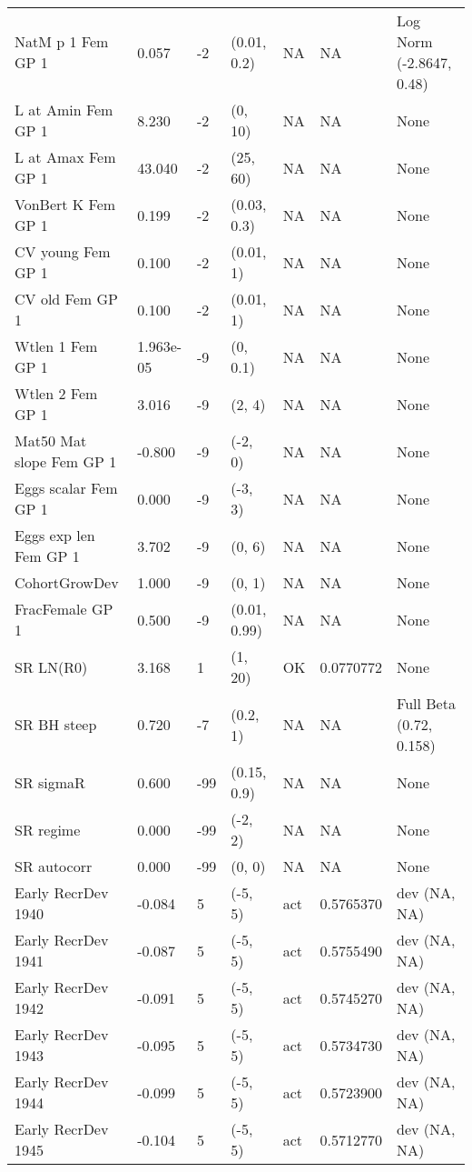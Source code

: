 \documentclass[11pt,
  english,
  a4paper,
]{article}
\begin{document}
\begin{landscape}
\begin{longtable}[t]{>{\raggedright\arraybackslash}p{6cm}lllll>{\raggedright\arraybackslash}p{4cm}}
\endfoot
\bottomrule
\endlastfoot
NatM p 1 Fem GP 1 & 0.057 & -2 & (0.01, 0.2) & NA & NA & Log Norm (-2.8647, 0.48)\\
L at Amin Fem GP 1 & 8.230 & -2 & (0, 10) & NA & NA & None\\
L at Amax Fem GP 1 & 43.040 & -2 & (25, 60) & NA & NA & None\\
VonBert K Fem GP 1 & 0.199 & -2 & (0.03, 0.3) & NA & NA & None\\
CV young Fem GP 1 & 0.100 & -2 & (0.01, 1) & NA & NA & None\\
CV old Fem GP 1 & 0.100 & -2 & (0.01, 1) & NA & NA & None\\
Wtlen 1 Fem GP 1 & 1.963e-05 & -9 & (0, 0.1) & NA & NA & None\\
Wtlen 2 Fem GP 1 & 3.016 & -9 & (2, 4) & NA & NA & None\\
Mat50%
Mat slope Fem GP 1 & -0.800 & -9 & (-2, 0) & NA & NA & None\\
Eggs scalar Fem GP 1 & 0.000 & -9 & (-3, 3) & NA & NA & None\\
Eggs exp len Fem GP 1 & 3.702 & -9 & (0, 6) & NA & NA & None\\
CohortGrowDev & 1.000 & -9 & (0, 1) & NA & NA & None\\
FracFemale GP 1 & 0.500 & -9 & (0.01, 0.99) & NA & NA & None\\
SR LN(R0) & 3.168 & 1 & (1, 20) & OK & 0.0770772 & None\\
SR BH steep & 0.720 & -7 & (0.2, 1) & NA & NA & Full Beta (0.72, 0.158)\\
SR sigmaR & 0.600 & -99 & (0.15, 0.9) & NA & NA & None\\
SR regime & 0.000 & -99 & (-2, 2) & NA & NA & None\\
SR autocorr & 0.000 & -99 & (0, 0) & NA & NA & None\\
Early RecrDev 1940 & -0.084 & 5 & (-5, 5) & act & 0.5765370 & dev (NA, NA)\\
Early RecrDev 1941 & -0.087 & 5 & (-5, 5) & act & 0.5755490 & dev (NA, NA)\\
Early RecrDev 1942 & -0.091 & 5 & (-5, 5) & act & 0.5745270 & dev (NA, NA)\\
Early RecrDev 1943 & -0.095 & 5 & (-5, 5) & act & 0.5734730 & dev (NA, NA)\\
Early RecrDev 1944 & -0.099 & 5 & (-5, 5) & act & 0.5723900 & dev (NA, NA)\\
Early RecrDev 1945 & -0.104 & 5 & (-5, 5) & act & 0.5712770 & dev (NA, NA)\\

\end{longtable}
\end{landscape}
\end{document}
